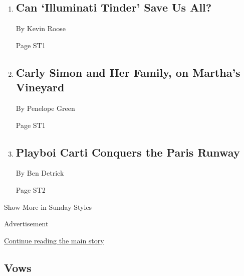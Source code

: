 \begin{enumerate}
\def\labelenumi{\arabic{enumi}.}
\item
  \href{/2018/06/27/style/raya-dating-app.html}{}

  \hypertarget{can-illuminati-tinder-save-us-all}{%
  \subsection{Can `Illuminati Tinder' Save Us
  All?}\label{can-illuminati-tinder-save-us-all}}

  By Kevin Roose

  Page ST1
\item
  \href{/2018/06/30/style/carly-simon-family-band-marthas-vineyard.html}{}

  \hypertarget{carly-simon-and-her-family-on-marthas-vineyard-1}{%
  \subsection{Carly Simon and Her Family, on Martha's
  Vineyard}\label{carly-simon-and-her-family-on-marthas-vineyard-1}}

  By Penelope Green

  Page ST1
\item
  \href{/2018/06/29/style/playboi-carti-louis-vuitton-virgil-abloh-paris-mens-fashion-week.html}{}

  \hypertarget{playboi-carti-conquers-the-paris-runway}{%
  \subsection{Playboi Carti Conquers the Paris
  Runway}\label{playboi-carti-conquers-the-paris-runway}}

  By Ben Detrick

  Page ST2
\end{enumerate}

Show More in Sunday Styles

Advertisement

\protect\hyperlink{after-mid7}{Continue reading the main story}

\hypertarget{vows}{%
\subsection{Vows}\label{vows}}

